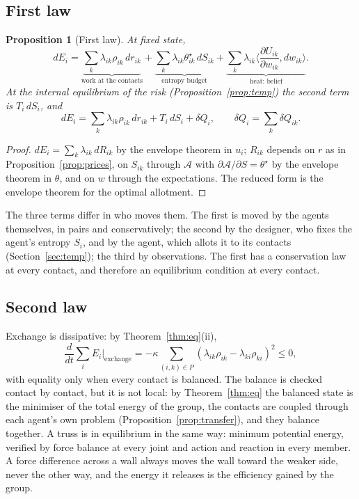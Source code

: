 \documentclass[11pt]{article}
\newtheorem{proposition}[theorem]{Proposition}
\theoremstyle{definition}
\theoremstyle{remark}
\newcommand{\A}{\mathcal{A}}
\begin{document}
\subsection{First law}
\begin{proposition}[First law]\label{prop:first}
At fixed state,
\[
dE_i=\underbrace{\sum_k\lambda_{ik}\rho_{ik}\,dr_{ik}}_{\text{work at the contacts}}+\underbrace{\sum_k\lambda_{ik}\theta^\star_{ik}\,dS_{ik}}_{\text{entropy budget}}+\underbrace{\sum_k\lambda_{ik}\Big\langle\frac{\partial U_{ik}}{\partial w_{ik}},dw_{ik}\Big\rangle}_{\text{heat: belief}}.
\]
At the internal equilibrium of the risk (Proposition~\ref{prop:temp}) the second term is $T_i\,dS_i$, and
\[
dE_i=\sum_k\lambda_{ik}\rho_{ik}\,dr_{ik}+T_i\,dS_i+\delta Q_i,\qquad \delta Q_i=\sum_k\delta Q_{ik}.
\]
\end{proposition}
\begin{proof}
$dE_i=\sum_k\lambda_{ik}\,dR_{ik}$ by the envelope theorem in $u_i$; $R_{ik}$ depends on $r$ as in Proposition~\ref{prop:prices}, on $S_{ik}$ through $\A$ with $\partial\A/\partial S=\theta^\star$ by the envelope theorem in $\theta$, and on $w$ through the expectations. The reduced form is the envelope theorem for the optimal allotment.
\end{proof}

The three terms differ in who moves them. The first is moved by the agents themselves, in pairs and conservatively; the second by the designer, who fixes the agent's entropy $S_i$, and by the agent, which allots it to its contacts (Section~\ref{sec:temp}); the third by observations. The first has a conservation law at every contact, and therefore an equilibrium condition at every contact.

\subsection{Second law}
Exchange is dissipative: by Theorem~\ref{thm:eq}(ii),
\[
\frac{d}{dt}\sum_iE_i\Big|_{\text{exchange}}=-\kappa\sum_{(i,k)\in P}(\lambda_{ik}\rho_{ik}-\lambda_{ki}\rho_{ki})^2\le0,
\]
with equality only when every contact is balanced. The balance is checked contact by contact, but it is not local: by Theorem~\ref{thm:eq} the balanced state is the minimiser of the total energy of the group, the contacts are coupled through each agent's own problem (Proposition~\ref{prop:transfer}), and they balance together. A truss is in equilibrium in the same way: minimum potential energy, verified by force balance at every joint and action and reaction in every member. A force difference across a wall always moves the wall toward the weaker side, never the other way, and the energy it releases is the efficiency gained by the group.
\end{document}
